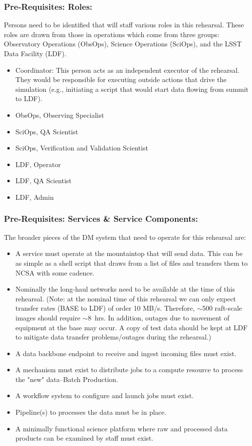 \subsubsection{Pre-Requisites: Roles:}

Persons need to be identified that will staff various roles in this 
rehearsal.  These roles are drawn from those in operations which come
from three groups: Observatory Operations (ObsOps), Science Operations 
(SciOps), and the LSST Data Facility (LDF).
\begin{itemize}[topsep=-8pt]
\item Coordinator:  This person acts as an independent executor of the 
rehearsal.  They would be responsible for executing outside actions that drive the 
simulation (e.g., initiating a script that would start data flowing from 
summit to LDF).
\item ObsOps, Observing Specialist
\item SciOps, QA Scientist
\item SciOps, Verification and Validation Scientist
\item LDF, Operator
\item LDF, QA Scientist
\item LDF, Admin
\end{itemize}

\subsubsection{Pre-Requisites: Services \& Service Components:}

The broader pieces of the DM system that need to operate for this rehearsal are:
\begin{itemize}[topsep=-8pt]
\item A service must operate at the mountaintop that will send data.  This can 
be as simple as a shell script that draws from a list of files and transfers 
them to NCSA with some cadence. 
\item  Nominally the long-haul networks need to be available at the time of this rehearsal.
(Note: at the nominal time of this rehearsal we can only expect transfer rates (BASE to LDF)
of order 10 MB/s.  Therefore, $\sim$500 raft-scale images should require $\sim$8~hrs.  In
addition, outages due to movement of equipment at the base may occur. A copy of test data 
should be kept at LDF to mitigate data transfer problems/outages during the rehearsal.)
\item A data backbone endpoint to receive and ingest incoming files must exist.
\item A mechanism must exist to distribute jobs to a compute resource 
to process the "new" data--Batch Production.
\item A workflow system to configure and launch jobs must exist.
\item Pipeline(s) to processes the data must be in place.
\item A minimally functional science platform where raw and processed data products can be 
examined by staff must exist.
\end{itemize}

